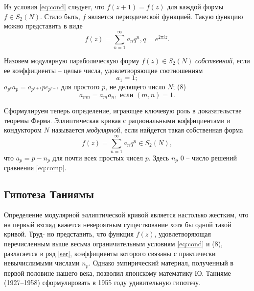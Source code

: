 \begin{multicols}{3}
Из условия \eqref{eq:cond} следует, что $f(z + 1) = f(z)$ для каждой формы $f \in S_2(N)$. Стало быть, $f$ является периодической функцией. Такую функцию можно представить в виде
\begin{equation}
    \tag{7}
    \label{eq:ser}
    f(z) = \sum_{n=1}^{\infty} a_nq^n, q = e^{2\pi iz}.
\end{equation}

Назовем модулярную параболическую форму $f(z) \in S_2(N)$ \emph{собственной}, если ее коэффициенты -- целые числа, удовлетворяющие соотношениям
\begin{equation*}
    a_1 = 1;
\end{equation*}
$a_{p^r}a_p = a_{p^{r+1}}pc_{p^{r-1}}$ для простого $p$, не делящего число $N$; (8)
\begin{equation*}
    a_{mn} = a_ma_n, \text{ если } (m, n) = 1.
\end{equation*}

Сформулируем теперь определение, играющее ключевую роль в доказательстве теоремы Ферма. Эллиптическая кривая с рациональными коффициентами и кондуктором $N$ называется \emph{модулярной}, если найдется такая собственная форма
\begin{equation}
    \tag{9}
    f(z) = \sum_{n=1}^{\infty} a_nq^n \in S_2(N),
\end{equation}
что $a_p = p - n_p$ для почти всех простых чисел $p$. Здесь $n_p$ 0 -- число решений сравнения \eqref{eq:comp}.
\subsection*{Гипотеза Таниямы}
\noindent
Определение модулярной эллиптической кривой является настолько жестким, что на первый взгляд кажется невероятным существование хотя бы одной такой кривой. Труд- но представить, что функция $f(z)$, удовлетворяющая перечисленным выше весьма ограничительным условиям \eqref{eq:cond} и (8), разлагается в ряд \eqref{ser}, коэффициенты которого связаны с практически невычислимыми числами $n_p$. Однако эмпирический материал, полученный в первой половине нашего века, позволил японскому математику Ю. Танияме (1927–1958) сформулировать в 1955 году удивительную гипотезу.
\end{multicols}
